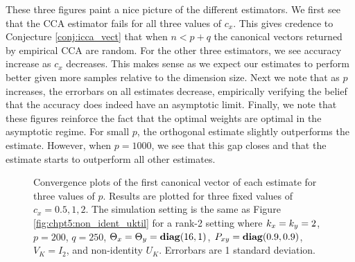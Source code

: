 These three figures paint a nice picture of the different estimators. We first see that
the CCA estimator fails for all three values of $c_x$. This gives credence to Conjecture
\ref{conj:icca_vect} that when $n< p+q$ the canonical vectors returned by empirical CCA
are random. For the other three estimators, we see accuracy increase as $c_x$
decreases. This makes sense as we expect our estimates to perform better given more
samples relative to the dimension size. Next we note that as $p$ increases, the errorbars
on all estimates decrease, empirically verifying the belief that the accuracy does indeed
have an asymptotic limit. Finally, we note that these figures reinforce the fact that the
optimal weights are optimal in the asymptotic regime. For small $p$, the orthogonal
estimate slightly outperforms the \iccap estimate. However, when $p=1000$, we see that
this gap closes and that the \iccap estimate starts to outperform all other estimates.

\begin{figure}
  \begin{center}
    \caption{Convergence plots of the first canonical vector of each estimate for three
      values of $p$. Results are plotted for three fixed values of $c_x=0.5,1,2$. The
      simulation setting is the same as Figure \ref{fig:chpt5:non_ident_uktil} for a
      rank-2 setting where $k_x=k_y=2$, $p=200$, $q=250$, $\Theta_x=\Theta_y=\mathop{\bf diag}(16,1)$,
      $P_{xy}=\mathop{\bf diag}(0.9,0.9)$, $V_K=I_2$, and non-identity $U_K$. Errorbars are 1 standard deviation.}
    \label{fig:chpt5:icca_convg_w1}
  \end{center}
\end{figure}


